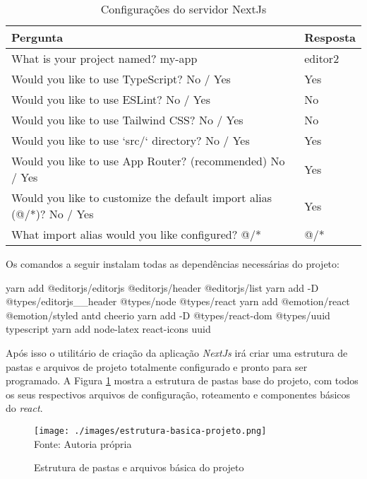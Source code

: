 \begin{table}[H]
    \centering
    \caption{Configurações do servidor NextJs}
    \label{tbl:config-next-app}
    \renewcommand{\arraystretch}{1.5}
    \begin{tabular}{p{13.0848cm} p{1.9552cm}}
        \hline
        \textbf{Pergunta} & \textbf{Resposta} \\
        \hline
        What is your project named? my-app & editor2 \\
		Would you like to use TypeScript? No / Yes & Yes \\
		Would you like to use ESLint? No / Yes & No \\
		Would you like to use Tailwind CSS? No / Yes & No \\
		Would you like to use `src/` directory? No / Yes & Yes \\
		Would you like to use App Router? (recommended) No / Yes & Yes \\
		Would you like to customize the default import alias (@/*)? No / Yes & Yes \\
		What import alias would you like configured? @/* & @/* \\
        \hline
        
    \end{tabular}
\end{table}

Os comandos a seguir instalam todas as dependências necessárias do projeto:

\begin{yarnAddDpts}
yarn add @editorjs/editorjs @editorjs/header @editorjs/list
yarn add -D @types/editorjs__header @types/node @types/react
yarn add @emotion/react @emotion/styled antd cheerio
yarn add -D @types/react-dom @types/uuid typescript 
yarn add node-latex react-icons uuid
\end{yarnAddDpts}

Após isso o utilitário de criação da aplicação \textit{NextJs}
irá criar uma estrutura de pastas e arquivos de projeto
totalmente configurado e pronto para ser programado.
A
Figura \ref{fig:estrutura-basica-projeto}
mostra a estrutura de pastas base do projeto, com todos os seus respectivos
arquivos de configuração, roteamento e componentes básicos do \textit{react}.

\begin{figure}[H]
    \centering
    \caption{Estrutura de pastas e arquivos básica do projeto}
    \texttt{[image: ./images/estrutura-basica-projeto.png]}
    \label{fig:estrutura-basica-projeto} \\
    \textnormal{\fontsize{10pt}{12pt}Fonte: Autoria própria}
\end{figure}

